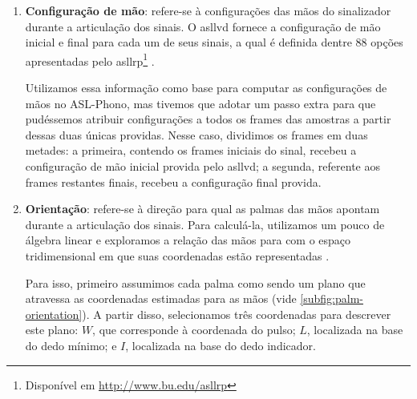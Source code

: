\begin{enumerate}
    \item \textbf{Configuração de mão}: refere-se à configurações das mãos do sinalizador durante a articulação dos sinais.
    O \acrshort{asllvd} fornece a configuração de mão inicial e final para cada um de seus sinais, a qual é definida dentre 88 opções apresentadas pelo \acrfull{asllrp}\footnote{Disponível em \url{http://www.bu.edu/asllrp}} \cite{neidle-2020-asllrp}.

    Utilizamos essa informação como base para computar as configurações de mãos no ASL-Phono, mas tivemos que adotar um passo extra para que pudéssemos atribuir configurações a todos os frames das amostras a partir dessas duas únicas providas. Nesse caso, dividimos os frames em duas metades: a primeira, contendo os frames iniciais do sinal, recebeu a configuração de mão inicial provida pelo \acrshort{asllvd}; a segunda, referente aos frames restantes finais, recebeu a configuração final provida.

    \item \textbf{Orientação}: refere-se à direção para qual as palmas das mãos apontam durante a articulação dos sinais.
    Para calculá-la, utilizamos um pouco de álgebra linear e exploramos a relação das mãos para com o espaço tridimensional em que suas coordenadas estão representadas \cite{anton-2013-algebra}.

    Para isso, primeiro assumimos cada palma como sendo um plano que atravessa as coordenadas estimadas para as mãos (vide \autoref{subfig:palm-orientation}). A partir disso, selecionamos três coordenadas para descrever este plano: \(W\), que corresponde à coordenada do pulso; \(L\), localizada na base do dedo mínimo; e \(I\), localizada na base do dedo indicador.


\end{enumerate}
